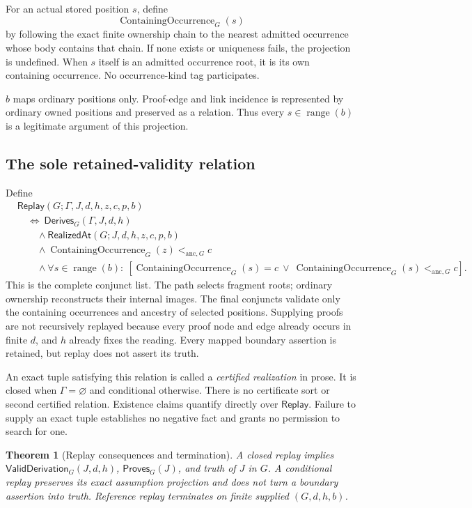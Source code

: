 \documentclass[11pt,twoside]{article}
\newcommand{\Replay}{\mathsf{Replay}}
\newcommand{\RealizedAt}{\mathsf{RealizedAt}}
\newcommand{\Proves}{\mathsf{Proves}}
\newcommand{\Derives}{\mathsf{Derives}}
\newcommand{\ValidDerivation}{\mathsf{ValidDerivation}}
\newtheorem{theorem}{Theorem}
\begin{document}
For an actual stored position \(s\), define
\[
  \operatorname{ContainingOccurrence}_G(s)
\]
by following the exact finite ownership chain to the nearest admitted occurrence
whose body contains that chain.  If none exists or uniqueness fails, the
projection is undefined.  When \(s\) itself is an admitted occurrence root, it is
its own containing occurrence.  No occurrence-kind tag participates.

\(b\) maps ordinary positions only.  Proof-edge and link incidence is represented
by ordinary owned positions and preserved as a relation.  Thus every
\(s\in\operatorname{range}(b)\) is a legitimate argument of this projection.

\subsection{The sole retained-validity relation}

Define
\[
\begin{split}
 &\Replay(G;\Gamma,J,d,h,z,c,p,b)\\
 &\quad\Longleftrightarrow\
 \Derives_G(\Gamma,J,d,h)\\
 &\qquad{}\land\RealizedAt(G;J,d,h,z,c,p,b)\\
 &\qquad{}\land
   \operatorname{ContainingOccurrence}_G(z)<_{\mathrm{anc},G}c\\
 &\qquad{}\land
   \forall s\in\operatorname{range}(b):\
   \left[
     \operatorname{ContainingOccurrence}_G(s)=c
     \ \lor\
     \operatorname{ContainingOccurrence}_G(s)<_{\mathrm{anc},G}c
   \right].
\end{split}
\]
This is the complete conjunct list.  The path selects fragment roots; ordinary
ownership reconstructs their internal images.  The final conjuncts validate only
the containing occurrences and ancestry of selected positions.  Supplying proofs
are not recursively replayed because every proof node and edge already occurs in
finite \(d\), and \(h\) already fixes the reading.  Every mapped boundary assertion
is retained, but replay does not assert its truth.

An exact tuple satisfying this relation is called a \emph{certified realization}
in prose.  It is closed when \(\Gamma=\varnothing\) and conditional otherwise.
There is no certificate sort or second certified relation.  Existence claims
quantify directly over \(\Replay\).  Failure to supply an exact tuple establishes
no negative fact and grants no permission to search for one.

\begin{theorem}[Replay consequences and termination]\label{thm:replay}
A closed replay implies
\(\ValidDerivation_G(J,d,h)\), \(\Proves_G(J)\), and truth of \(J\) in \(G\).
A conditional replay preserves its exact assumption projection and does not turn a
boundary assertion into truth.  Reference replay terminates on finite supplied
\((G,d,h,b)\).
\end{theorem}
\end{document}

